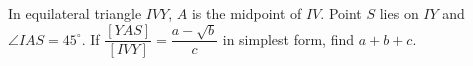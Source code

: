 In equilateral triangle $IVY$, $A$ is the midpoint of $IV$. Point $S$ lies on $IY$ and $\angle IAS=45^\circ$. If $\dfrac{[YAS]}{[IVY]}=\dfrac{a-\sqrt b}{c}$ in simplest form, find $a+b+c$.
